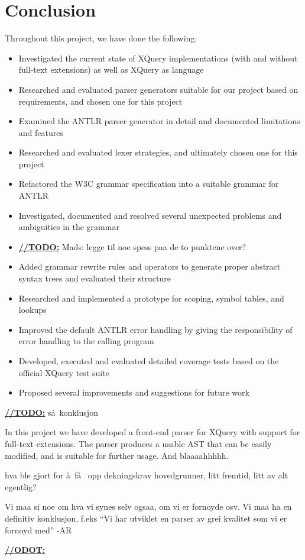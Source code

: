 \chapter{Conclusion}
Throughout this project, we have done the following:
\begin{itemize}
  \item Investigated the current state of XQuery implementations (with and
  without full-text extensions) as well as XQuery as language
  \item Researched and evaluated parser generators suitable
  for our project based on requirements, and chosen one for this project
  \item Examined the ANTLR parser generator in detail and documented
  limitations and features
  \item Researched and evaluated lexer strategies, and ultimately chosen one
  for this project
  \item Refactored the W3C grammar specification into a suitable grammar for
  ANTLR
  \item Investigated, documented and resolved several unexpected problems and
  ambiguities in the grammar
  \item \underline{\textbf{\LARGE //TODO:}} Mads: legge til noe spess paa de to
  punktene over?
  \item Added grammar rewrite rules and operators to generate proper abstract
  syntax trees and evaluated their structure
  \item Researched and implemented a prototype for scoping, symbol tables, and
  lookups
  \item Improved the default ANTLR error handling by giving the responsibility
  of error handling to the calling program
  \item Developed, executed and evaluated detailed coverage tests based on the
  official XQuery test suite
  \item Proposed several improvements and suggestions for future work
\end{itemize}


\underline{\textbf{\LARGE //TODO:}}
s\aa~konklusjon

In this project we have developed a front-end parser for XQuery with support for
full-text extensions. The parser produces a usable AST that can be easily
modified, and is suitable for further usage. And blaaaahhhhh.

hva ble gjort for \aa ~f\aa~ opp dekningskrav hovedgrunner, litt fremtid, litt
av alt egentlig? 

Vi maa si noe om hva vi synes selv ogsaa, om vi er fornoyde osv. Vi maa ha en
definitiv konklusjon, f.eks ``Vi har utviklet en parser av grei kvalitet som vi
er fornoyd med'' 
-AR

\underline{\textbf{\LARGE //ODOT:}}